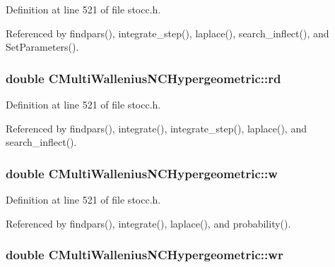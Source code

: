 Definition at line 521 of file stocc.\-h.



Referenced by findpars(), integrate\-\_\-step(), laplace(), search\-\_\-inflect(), and Set\-Parameters().

\subsubsection[{rd}]{\setlength{\rightskip}{0pt plus 5cm}double C\-Multi\-Wallenius\-N\-C\-Hypergeometric\-::rd\hspace{0.3cm}{\ttfamily [protected]}}\label{class_c_multi_wallenius_n_c_hypergeometric_a652ff21a2a5effb4537af81d70222c3c}


Definition at line 521 of file stocc.\-h.



Referenced by findpars(), integrate(), integrate\-\_\-step(), laplace(), and search\-\_\-inflect().

\subsubsection[{w}]{\setlength{\rightskip}{0pt plus 5cm}double C\-Multi\-Wallenius\-N\-C\-Hypergeometric\-::w\hspace{0.3cm}{\ttfamily [protected]}}\label{class_c_multi_wallenius_n_c_hypergeometric_aa5826deeb6007553af2003a385550c5b}


Definition at line 521 of file stocc.\-h.



Referenced by findpars(), integrate(), laplace(), and probability().

\subsubsection[{wr}]{\setlength{\rightskip}{0pt plus 5cm}double C\-Multi\-Wallenius\-N\-C\-Hypergeometric\-::wr\hspace{0.3cm}{\ttfamily [protected]}}\label{class_c_multi_wallenius_n_c_hypergeometric_a188d160594f215b923ecba589f6b1f68}


